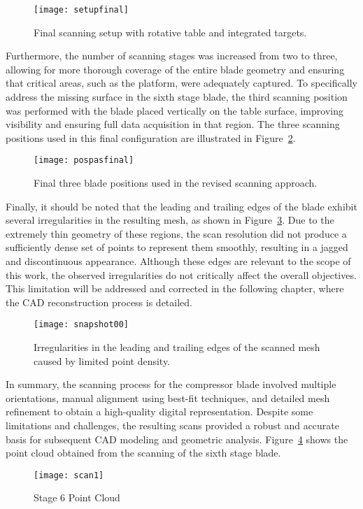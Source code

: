 \begin{figure}[H]
    \centering
    \texttt{[image: setupfinal]}
    \caption{Final scanning setup with rotative table and integrated targets.}
    \label{fig:setupfinal}
\end{figure}


Furthermore, the number of scanning stages was increased from two to three, allowing for more thorough coverage of the entire blade geometry and ensuring that critical areas, such as the platform, were adequately captured.
To specifically address the missing surface in the sixth stage blade, the third scanning position was performed with the blade placed vertically on the table surface, improving visibility and ensuring full data acquisition in that region.
The three scanning positions used in this final configuration are illustrated in Figure~\ref{fig:pospasfinal}.

\begin{figure}[H]
    \centering
    \texttt{[image: pospasfinal]}
    \caption{ Final three blade positions used in the revised scanning approach.}
    \label{fig:pospasfinal}
\end{figure}

Finally, it should be noted that the leading and trailing edges of the blade exhibit several irregularities in the resulting mesh, as shown in Figure~\ref{fig:snapshot}. 
Due to the extremely thin geometry of these regions, the scan resolution did not produce a sufficiently dense set of points to represent them smoothly, resulting in a jagged and discontinuous appearance. 
Although these edges are relevant to the scope of this work, the observed irregularities do not critically affect the overall objectives. 
This limitation will be addressed and corrected in the following chapter, where the CAD reconstruction process is detailed.

\begin{figure}[H]
    \centering
    \texttt{[image: snapshot00]}
    \caption{ Irregularities in the leading and trailing edges of the scanned mesh caused by limited point density.}
    \label{fig:snapshot}
\end{figure}

In summary, the scanning process for the compressor blade involved multiple orientations, manual alignment using best-fit techniques, and detailed mesh refinement to obtain a high-quality digital representation. Despite some limitations and challenges, the resulting scans provided a robust and accurate basis for subsequent CAD modeling and geometric analysis. Figure~\ref{fig:scan1} shows the point cloud obtained from the scanning of the sixth stage blade.
\begin{figure}[H]
    \centering
    \texttt{[image: scan1]}
    \caption{Stage 6 Point Cloud}
    \label{fig:scan1}
\end{figure}

